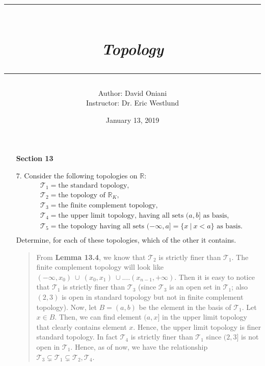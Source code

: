\documentclass[12pt, a4paper]{article}
\title{\rule{\paperwidth - 150pt}{1pt}\textbf{\\\textit{Topology}\\}\rule{\paperwidth - 150pt}{1pt}}
\author
{
Author: David Oniani\\
Instructor: Dr. Eric Westlund
}
\date{January 13, 2019}
\newcommand{\reals}{\mathbb{R}} %
\newcommand{\topology}{\mathcal{T}} %
\begin{document}
\maketitle


\begin{itemize}
\item[]
\item[]
{\large \textbf{Section 13}}
\vspace{0.3cm}


\item[7.]
Consider the following topologies on $\reals$:
\begin{align*}
&\topology_1 = \mbox{the standard topology,}\\
&\topology_2 = \mbox{the topology of }\reals_K,\\
&\topology_3 = \mbox{the finite complement topology,}\\
&\topology_4 = \mbox{the upper limit topology, having all sets }(a, b] \mbox{ as basis,}\\
&\topology_5 = \mbox{the topology having all sets }(-\infty, a] = \{x \ | \ x < a\} \mbox{ as basis.}\\
\end{align*}
Determine, for each of these topologies, which of the other it contains.
\begin{quote}
From \textbf{Lemma 13.4}, we know that $\topology_2$ is strictly finer than $\topology_1$.
\newline
\newline
The finite complement topology will look like $(-\infty, x_0) \ \cup \ (x_0, x_1) \ \cup .... (x_{n - 1}, +\infty)$.
Then it is easy to notice that $\topology_1$ is strictly finer than $\topology_3$ (since $\topology_3$ is an open set in $\topology_1$; also $(2, 3)$ is open in standard topology but not in finite complement topology).
\newline
\newline
Now, let $B = (a, b)$ be the element in the basis of $\topology_1$. Let $x \in B$. Then, we can
find element $(a, x]$ in the upper limit topology that clearly contains element $x$. Hence, the upper limit
topology is finer standard topology. In fact $\topology_4$ is strictly finer than $\topology_1$ since $(2, 3]$
is not open in $\topology_1$.
\newline
\newline
Hence, as of now, we have the relationship $\topology_3 \subsetneq \topology_1 \subsetneq \topology_2, \topology_4$.

\end{quote}
\end{itemize}
\end{document}
